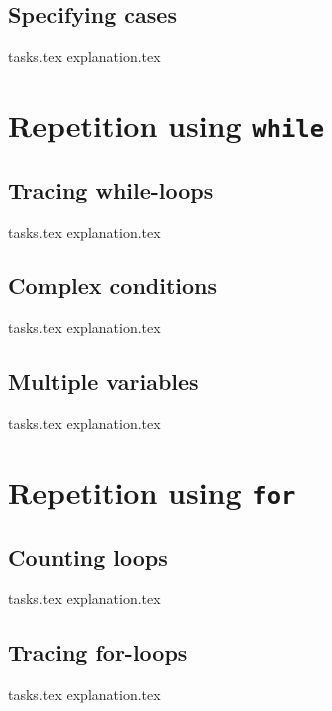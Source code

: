     \section{Specifying cases}
    {tasks.tex}              \newpage
    {explanation.tex}           \newpage

    \chapter{Repetition using \texttt{while}}
    \newpage

    \section{Tracing while-loops}
    {tasks.tex}           \newpage
    {explanation.tex}        \newpage

    \section{Complex conditions}
    {tasks.tex} \newpage
    {explanation.tex} \newpage

    \section{Multiple variables}
    {tasks.tex}     \newpage
    {explanation.tex}  \newpage

    \chapter{Repetition using \texttt{for}}
    \newpage

    \section{Counting loops}
    {tasks.tex}         \newpage
    {explanation.tex}      \newpage

    \section{Tracing for-loops}
    {tasks.tex}               \newpage
    {explanation.tex}            \newpage

